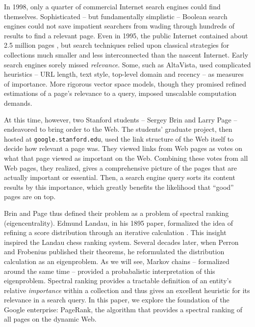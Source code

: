 \documentclass[../exploring-pagerank.tex]{subfiles}
\begin{document}
In 1998, only a quarter of commercial Internet search engines could find themselves. Sophisticated -- but fundamentally simplistic -- Boolean search engines could not save impatient searchers from wading through hundreds of results to find a relevant page. Even in 1995, the public Internet contained about 2.5 million pages \cite{TotalNumberWebsites}, but search techniques relied upon classical strategies for collections much smaller and less interconnected than the nascent Internet. Early search engines sorely missed \textit{relevance}. Some, such as AltaVista, used complicated heuristics -- URL length, text style, top-level domain and recency -- as measures of importance. More rigorous vector space models, though they promised refined estimations of a page's relevance to a query, imposed unscalable computation demands.

At this time, however, two Stanford students -- Sergey Brin and Larry Page -- endeavored to bring order to the Web. The students’ graduate project, then hosted at \texttt{google.stanford.edu}, used the link structure of the Web itself to decide how relevant a page was. They viewed links from Web pages as votes on what that page viewed as important on the Web. Combining these votes from all Web pages, they realized, gives a comprehensive picture of the pages that are actually important or essential. Then, a search engine query sorts its content results by this importance, which greatly benefits the likelihood that ``good'' pages are on top.

Brin and Page thus defined their problem as a problem of spectral ranking (eigencentrality). Edmund Landau, in his 1895 paper, formalized the idea of refining a score distribution through an iterative calculation \cite{vignaSpectralRanking2009}. This insight inspired the Landau chess ranking system. Several decades later, when Perron and Frobenius published their theorems, he reformulated the distribution calculation as an eigenproblem. As we will see, Markov chains -- formalized around the same time -- provided a probabalistic interpretation of this eigenproblem. Spectral ranking provides a tractable definition of an entity's relative \textit{importance} within a collection and thus gives an excellent heuristic for its relevance in a search query. In this paper, we explore the foundation of the Google enterprise: PageRank, the algorithm that provides a spectral ranking of all pages on the dynamic Web.
\end{document}
